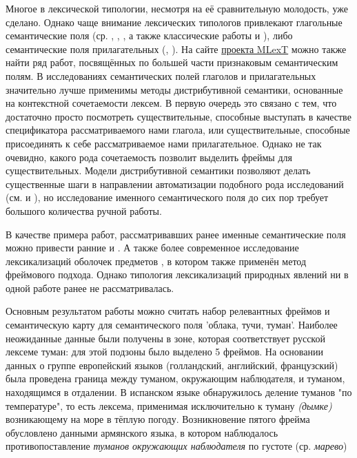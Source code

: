 \par Многое в лексической типологии, несмотря на её сравнительную молодость, уже сделано. Однако чаще внимание лексических типологов привлекают глагольные семантические поля (ср. \citep{майсак2007глаголы}, \citep{кузьменко2015глаголы}, \citep{багдасарянглаголы}, а также классические работы \citep{newman2009linguistics} и \citep{majid2007semantic}), либо семантические поля прилагательных (\citep{архангельский2011качественные}, \citep{кюсева2010признаковая}). На сайте \hyperlink{mlext}{проекта MLexT} можно также найти ряд работ, посвящённых по большей части признаковым семантическим полям. В исследованиях семантических полей глаголов и прилагательных значительно лучше применимы методы дистрибутивной семантики, основанные на контекстной сочетаемости лексем. В первую очередь это связано с тем, что достаточно просто посмотреть существительные, способные выступать в качестве спецификатора рассматриваемого нами глагола, или существительные, способные присоединять к себе рассматриваемое нами прилагательное. Однако не так очевидно, какого рода сочетаемость позволит выделить фреймы для существительных. Модели дистрибутивной семантики позволяют делать существенные шаги в направлении автоматизации подобного рода исследований (см. \citep{орехов2015компьютерные} и \citep{рыжова2018автоматизация}), но исследование именного семантического поля до сих пор требует большого количества ручной работы. 
\par В качестве примера работ, рассматривавших ранее именные семантические поля можно привести ранние \citep{greenberg1990universals} и \citep{koch1999tree}. А также более современное исследование лексикализаций оболочек предметов \citep{шкурныйвопрос}, в котором также применён метод фреймового подхода. Однако типология лексикализаций природных явлений ни в одной работе ранее не рассматривалась.

\par Основным результатом работы \citep{соколовский2017} можно считать набор релевантных фреймов и семантическую карту для семантического поля 'облака, тучи, туман'. Наиболее неожиданные данные были получены в зоне, которая соответствует русской лексеме туман: для этой подзоны было выделено 5 фреймов. На основании данных о группе европейский языков (голландский, английский, французский) была проведена граница между туманом, окружающим наблюдателя, и туманом, находящимся в отдалении. В испанском языке обнаружилось деление туманов "по температуре", то есть лексема, применимая исключительно к туману \textit{(дымке)} возникающему на море в тёплую погоду. Возникновение пятого фрейма обусловлено данными армянского языка, в котором наблюдалось противопоставление \textit{туманов окружающих наблюдателя} по густоте (ср. \textit{марево})

